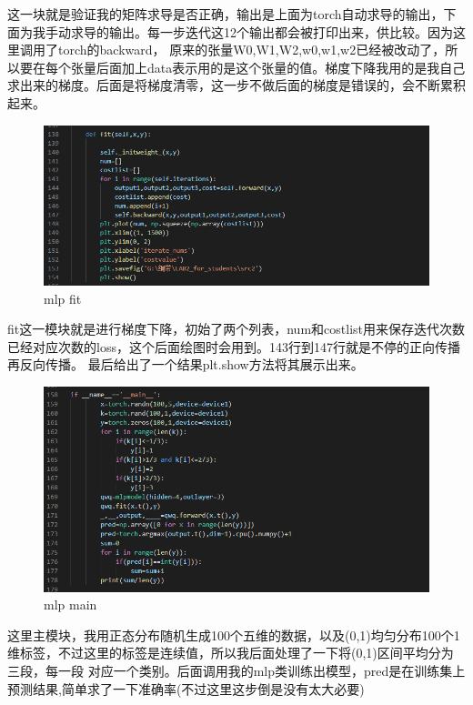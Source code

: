 \documentclass{report}
\begin{document}
    这一块就是验证我的矩阵求导是否正确，输出是上面为torch自动求导的输出，下面为我手动求导的输出。每一步迭代这12个输出都会被打印出来，供比较。因为这里调用了torch的backward，
    原来的张量W0,W1,W2,w0,w1,w2已经被改动了，所以要在每个张量后面加上data表示用的是这个张量的值。梯度下降我用的是我自己求出来的梯度。后面是将梯度清零，这一步不做后面的梯度是错误的，会不断累积起来。\par 
    \begin{figure}[H]
        \centering
        \includegraphics[width=15cm]{11.png}
        \caption{mlp fit}
    \end{figure}
    fit这一模块就是进行梯度下降，初始了两个列表，num和costlist用来保存迭代次数已经对应次数的loss，这个后面绘图时会用到。143行到147行就是不停的正向传播再反向传播。
    最后给出了一个结果plt.show方法将其展示出来。\par 
    \begin{figure}[H]
        \centering
        \includegraphics[width=15cm]{12.png}
        \caption{mlp main}
    \end{figure}
    这里主模块，我用正态分布随机生成100个五维的数据，以及(0,1)均匀分布100个1维标签，不过这里的标签是连续值，所以我后面处理了一下将(0,1)区间平均分为三段，每一段
    对应一个类别。后面调用我的mlp类训练出模型，pred是在训练集上预测结果,简单求了一下准确率(不过这里这步倒是没有太大必要)\par 
    
\end{document}
